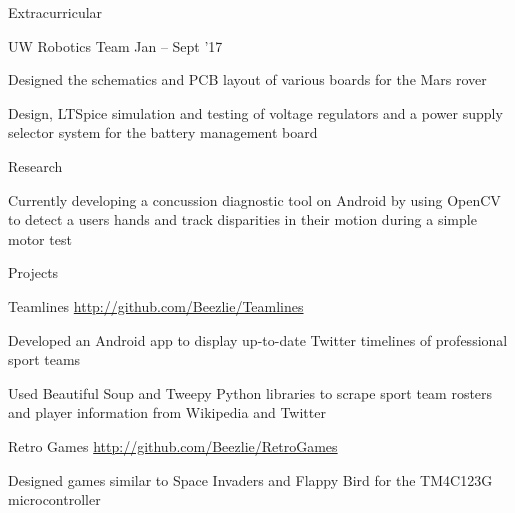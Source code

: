\documentclass{resume} %
\begin{document}
	
	\begin{rSection}{Extracurricular}
	
		\begin{rSubsection}{UW Robotics Team}
			{}
			{}
			{Jan -- Sept '17}

			\item Designed the schematics and PCB layout of various boards for the Mars rover
			\item Design, LTSpice simulation and testing of voltage regulators and a power supply selector system for the battery management board

		\end{rSubsection}

		\begin{rSubsection}{Research}			
			{}
			{}
			{}


			\item Currently developing a concussion diagnostic tool on Android by using OpenCV to detect a users hands and track disparities in their motion during a simple motor test
		\end{rSubsection}	
	\end{rSection}

	
	\begin{rSection}{Projects}
		\begin{rSubsection}{Teamlines}
			{\href{http://github.com/Beezlie/Teamlines}{http://github.com/Beezlie/Teamlines}}
			{}{}
			
			\item Developed an Android app to display up-to-date Twitter timelines of professional sport teams
			\item Used Beautiful Soup and Tweepy Python libraries to scrape sport team rosters and player information from Wikipedia and Twitter
		\end{rSubsection}
		\begin{rSubsection}{Retro Games}
			{\href{http://github.com/Beezlie/RetroGames}{http://github.com/Beezlie/RetroGames}}
			{}{}
		
			\item Designed games similar to Space Invaders and Flappy Bird for the TM4C123G microcontroller
		\end{rSubsection}
	\end{rSection}
	
\end{document}

